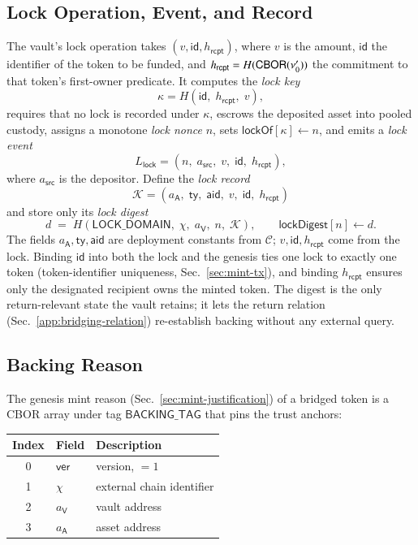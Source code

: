\subsection{Lock Operation, Event, and Record}\label{app:bridging-lock-op}

The vault's lock operation takes $(v, \mathsf{id}, h_\mathsf{rcpt})$, where $v$ is the amount, $\mathsf{id}$ the identifier of the token to be funded, and $h_\mathsf{rcpt} = H(\mathsf{CBOR}(\nu'_0))$ the commitment to that token's first-owner predicate. It computes the \emph{lock key}
\[
\kappa = H(\mathsf{id},\; h_\mathsf{rcpt},\; v),
\]
requires that no lock is recorded under $\kappa$, escrows the deposited asset into pooled custody, assigns a monotone \emph{lock nonce} $n$, sets $\mathsf{lockOf}[\kappa] \gets n$, and emits a \emph{lock event}
\[
L_\mathsf{lock} = (n,\; a_\mathsf{src},\; v,\; \mathsf{id},\; h_\mathsf{rcpt}),
\]
where $a_\mathsf{src}$ is the depositor. Define the \emph{lock record}
\[
\mathcal{K} = (a_\mathsf{A},\; \mathsf{ty},\; \mathsf{aid},\; v,\; \mathsf{id},\; h_\mathsf{rcpt})
\]
and store only its \emph{lock digest}
\[
d \;=\; H(\mathsf{LOCK\_DOMAIN},\; \chi,\; a_\mathsf{V},\; n,\; \mathcal{K}),
\qquad \mathsf{lockDigest}[n] \gets d .
\]
The fields $a_\mathsf{A},\mathsf{ty},\mathsf{aid}$ are deployment constants from $\mathcal{C}$; $v,\mathsf{id},h_\mathsf{rcpt}$ come from the lock. Binding $\mathsf{id}$ into both the lock and the genesis ties one lock to exactly one token (token-identifier uniqueness, Sec.~\ref{sec:mint-tx}), and binding $h_\mathsf{rcpt}$ ensures only the designated recipient owns the minted token. The digest is the only return-relevant state the vault retains; it lets the return relation (Sec.~\ref{app:bridging-relation}) re-establish backing without any external query.

\subsection{Backing Reason}\label{app:bridging-backing-reason}

The genesis mint reason (Sec.~\ref{sec:mint-justification}) of a bridged token is a CBOR array under tag $\mathsf{BACKING\_TAG}$ that pins the trust anchors:

\begin{longtable}{clp{8.4cm}}
\textbf{Index} & \textbf{Field} & \textbf{Description} \\
\hline
\endhead
0 & $\mathsf{ver}$ & version, $=1$ \\
1 & $\chi$ & external chain identifier \\
2 & $a_\mathsf{V}$ & vault address \\
3 & $a_\mathsf{A}$ & asset address \\
\end{longtable}

